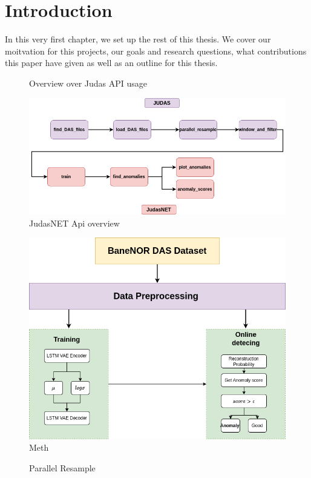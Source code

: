 \chapter{Introduction}
\label{chap:introduction}

In this very first chapter, we set up the rest of this thesis. We cover our moitvation for this projects, our goals and research questions, what contributions this paper have given as well as an outline for this thesis.

\begin{figure}[h]
    \centering
    
    \caption{Overview over Judas API usage}
    \label{fig:judas_overview}
\end{figure}

\begin{figure}[h]
    \centering
    \includegraphics[scale=.5]{figures/api_overview.png}
    \caption{JudasNET Api overview}
    \label{fig:judasnet_overview}
\end{figure}

\begin{figure}[h]
    \centering
    \includegraphics[scale=.5]{figures/methodflow.png}
    \caption{Meth}
    \label{fig:methodflow}
\end{figure}

\begin{figure}[h]
    \centering
    
    \caption{Parallel Resample}
    \label{fig:parallel_resample}
\end{figure}





